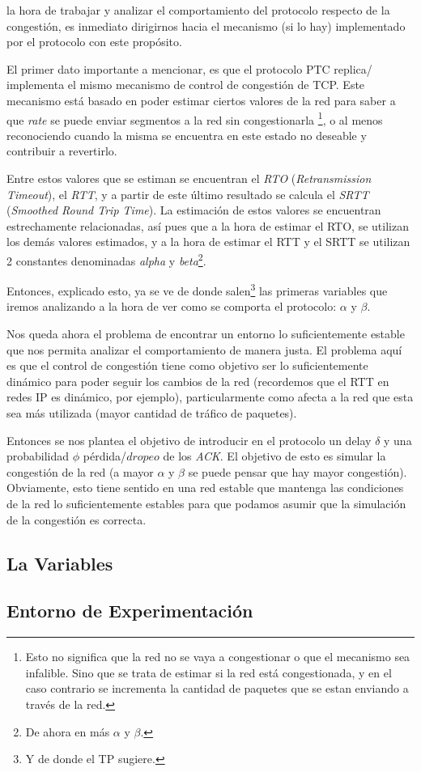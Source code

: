  la hora de trabajar y analizar el comportamiento del protocolo
respecto de la congesti\'on, es inmediato dirigirnos hacia el mecanismo (si lo
hay) implementado por el protocolo con este prop\'osito.

\par El primer dato importante a mencionar, es que el protocolo PTC replica/%
implementa el mismo mecanismo de control de congesti\'on de TCP\cite{rfc5681}.
Este mecanismo est\'a basado en poder estimar ciertos valores de la red para
saber a que \emph{rate} se puede enviar segmentos a la red sin congestionarla%
\footnote{Esto no significa que la red no se vaya a congestionar o que el
mecanismo sea infalible. Sino que se trata de estimar si la red est\'a congestionada,
y en el caso contrario se incrementa la cantidad de paquetes que se estan
enviando a trav\'es de la red.}, o al menos reconociendo cuando la misma se
encuentra en este estado no deseable y contribuir a revertirlo.

\par Entre estos valores que se estiman se encuentran el
\textit{RTO}\cite{rfc6298} (\emph{Retransmission Timeout}), el
\textit{RTT}\cite{rfc1323}\cite{karns_algorithm}\cite{rfc6298}, y a partir
de este \'ultimo resultado se calcula el \textit{SRTT} (\textit{Smoothed Round
Trip Time}\cite{rfc6298}). La estimaci\'on de estos valores se encuentran
estrechamente relacionadas, as\'i pues que a la hora de estimar el RTO, se
utilizan los dem\'as valores estimados, y a la hora de estimar el RTT y el SRTT
se utilizan 2 constantes denominadas \emph{alpha} y \emph{beta}\footnote{De
ahora en m\'as $\alpha$ y $\beta$.}\cite{rfc6298}.

\par Entonces, explicado esto, ya se ve de donde salen\footnote{Y de donde el
TP sugiere.} las primeras variables que iremos analizando a la hora de ver como
se comporta el protocolo: $\alpha$ y $\beta$.

\par Nos queda ahora el problema de encontrar un entorno lo suficientemente estable
que nos permita analizar el comportamiento de manera justa. El problema aqu\'i
es que el control de congesti\'on tiene como objetivo ser lo suficientemente
din\'amico para poder seguir los cambios de la red (recordemos que el RTT
en redes IP es din\'amico, por ejemplo), particularmente como afecta a la red
que esta sea m\'as utilizada (mayor cantidad de tr\'afico de paquetes).

\par Entonces se nos plantea el objetivo de introducir en el protocolo un delay
$\delta$ y una probabilidad $\phi$ p\'erdida/$dropeo$ de los \textit{ACK}. El
objetivo de esto es simular la congesti\'on de la red (a mayor $\alpha$ y $\beta$
se puede pensar que hay mayor congesti\'on). Obviamente, esto tiene sentido
en una red estable que mantenga las condiciones de la red lo suficientemente
estables para que podamos asumir que la simulaci\'on de la congesti\'on es
correcta.


\subsection*{La Variables}

\subsection*{Entorno de Experimentaci\'on}
